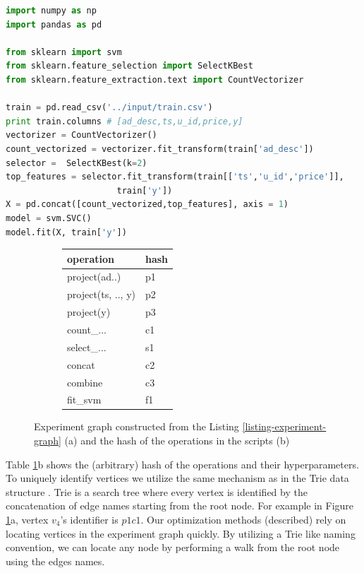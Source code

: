 \begin{lstlisting}[language=Python, caption=Example script,captionpos=b,label = {listing-experiment-graph}]
import numpy as np
import pandas as pd

from sklearn import svm
from sklearn.feature_selection import SelectKBest
from sklearn.feature_extraction.text import CountVectorizer

train = pd.read_csv('../input/train.csv') 
print train.columns # [ad_desc,ts,u_id,price,y]
vectorizer = CountVectorizer()
count_vectorized = vectorizer.fit_transform(train['ad_desc'])
selector =  SelectKBest(k=2)
top_features = selector.fit_transform(train[['ts','u_id','price']], 
				      train['y'])
X = pd.concat([count_vectorized,top_features], axis = 1)
model = svm.SVC()
model.fit(X, train['y'])
\end{lstlisting}

%
\begin{figure}
\begin{subfigure}[b]{0.5\linewidth}
\centering

\caption{}
\end{subfigure}%
\begin{subfigure}[b]{0.5\linewidth}
\begin{tabular}{l|l}
\textbf{operation} & \textbf{hash}\\
\hline
project(ad..) & p1 \\
project(ts, .., y) & p2\\
project(y) & p3\\
count\_... & c1 \\
select\_... & s1 \\
concat & c2 \\
combine & c3\\
fit\_svm & f1
\end{tabular}
\caption{}
\end{subfigure}
\caption{Experiment graph constructed from the Listing \ref{listing-experiment-graph} (a) and the hash of the operations in the scripts (b)}
\label{fig-experiment-graph}
\end{figure}
Table \ref{fig-experiment-graph}b shows the (arbitrary) hash of the operations and their hyperparameters.
To uniquely identify vertices we utilize the same mechanism as in the Trie data structure \cite{brass2008advanced}.
Trie is a search tree where every vertex is identified by the concatenation of edge names starting from the root node.
For example in Figure \ref{fig-experiment-graph}a, vertex $v_4$'s identifier is $p1c1$.
Our optimization methods (described) rely on locating vertices in the experiment graph quickly.
By utilizing a Trie like naming convention, we can locate any node by performing a walk from the root node using the edges names.

